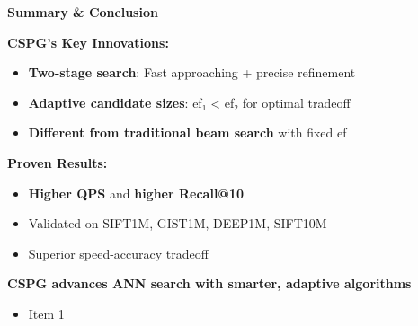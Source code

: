 \begin{frame}
\begin{center}
\Large \textbf{Summary \& Conclusion}
\end{center}

\vspace{0.5cm}

\textbf{CSPG's Key Innovations:}

\begin{itemize}
    \item \textbf{Two-stage search}: Fast approaching + precise refinement
    \item \textbf{Adaptive candidate sizes}: ef₁ < ef₂ for optimal tradeoff
    \item \textbf{Different from traditional beam search} with fixed ef
\end{itemize}

\vspace{0.5cm}

\textbf{Proven Results:}

\begin{itemize}
    \item \textbf{Higher QPS} and \textbf{higher Recall@10}
    \item Validated on SIFT1M, GIST1M, DEEP1M, SIFT10M
    \item Superior speed-accuracy tradeoff
\end{itemize}

\vspace{0.5cm}

\begin{center}
\large \textbf{CSPG advances ANN search with smarter, adaptive algorithms}
\end{center}
\end{frame}
\begin{frame}
\begin{itemize}
\item Item 1
\end{itemize}
\end{frame}
